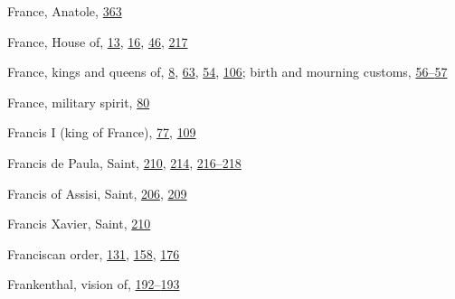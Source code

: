 France, Anatole,
\protect\hyperlink{21_Chapter_Thirteen__IMAGE_AND_WORD.xhtmlux5cux23page_363}{363}

France, House of,
\protect\hyperlink{08_Chapter_One__THE_PASSIONATE_INTE.xhtmlux5cux23page_13}{13},
\protect\hyperlink{08_Chapter_One__THE_PASSIONATE_INTE.xhtmlux5cux23page_16}{16},
\protect\hyperlink{09_Chapter_Two__THE_CRAVING_FOR_A_M.xhtmlux5cux23page_46}{46},
\protect\hyperlink{14_Chapter_Seven__THE_PIOUS_PERSONA.xhtmlux5cux23page_217}{217}

France, kings and queens of,
\protect\hyperlink{08_Chapter_One__THE_PASSIONATE_INTE.xhtmlux5cux23page_8}{8},
\protect\hyperlink{10_Chapter_Three__THE_HEROIC_DREAM.xhtmlux5cux23page_63}{63},
\protect\hyperlink{09_Chapter_Two__THE_CRAVING_FOR_A_M.xhtmlux5cux23page_54}{54},
\protect\hyperlink{10_Chapter_Three__THE_HEROIC_DREAM.xhtmlux5cux23page_106}{106};
birth and mourning customs,
\protect\hyperlink{09_Chapter_Two__THE_CRAVING_FOR_A_M.xhtmlux5cux23page_56}{56--}\protect\hyperlink{09_Chapter_Two__THE_CRAVING_FOR_A_M.xhtmlux5cux23page_57}{57}

France, military spirit,
\protect\hyperlink{10_Chapter_Three__THE_HEROIC_DREAM.xhtmlux5cux23page_80}{80}

Francis I (king of France),
\protect\hyperlink{10_Chapter_Three__THE_HEROIC_DREAM.xhtmlux5cux23page_77}{77},
\protect\hyperlink{10_Chapter_Three__THE_HEROIC_DREAM.xhtmlux5cux23page_109}{109}

Francis de Paula, Saint,
\protect\hyperlink{14_Chapter_Seven__THE_PIOUS_PERSONA.xhtmlux5cux23page_210}{210},
\protect\hyperlink{14_Chapter_Seven__THE_PIOUS_PERSONA.xhtmlux5cux23page_214}{214},
\protect\hyperlink{14_Chapter_Seven__THE_PIOUS_PERSONA.xhtmlux5cux23page_216}{216--}\protect\hyperlink{14_Chapter_Seven__THE_PIOUS_PERSONA.xhtmlux5cux23page_218}{218}

Francis of Assisi, Saint,
\protect\hyperlink{14_Chapter_Seven__THE_PIOUS_PERSONA.xhtmlux5cux23page_206}{206},
\protect\hyperlink{14_Chapter_Seven__THE_PIOUS_PERSONA.xhtmlux5cux23page_209}{209}

Francis Xavier, Saint,
\protect\hyperlink{14_Chapter_Seven__THE_PIOUS_PERSONA.xhtmlux5cux23page_210}{210}

Franciscan order,
\protect\hyperlink{11_Chapter_Four__THE_FORMS_OF_LOVE.xhtmlux5cux23page_131}{131},
\protect\hyperlink{12_Chapter_Five__THE_VISION_OF_DEAT.xhtmlux5cux23page_158}{158},
\protect\hyperlink{13_Chapter_Six__THE_DEPICTION_OF_TH.xhtmlux5cux23page_176}{176}

Frankenthal, vision of,
\protect\hyperlink{13_Chapter_Six__THE_DEPICTION_OF_TH.xhtmlux5cux23page_192}{192--}\protect\hyperlink{13_Chapter_Six__THE_DEPICTION_OF_TH.xhtmlux5cux23page_193}{193}

